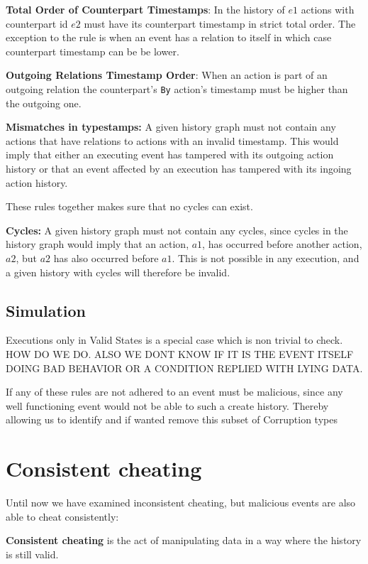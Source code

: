 	\newpar \textbf{Total Order of Counterpart Timestamps}: In the history of $e1$ actions with counterpart id $e2$ must have its counterpart timestamp in strict total order.  The exception to the rule is when an event has a relation to itself in which case counterpart timestamp can be be lower. 
	
	\newpar \textbf{Outgoing Relations Timestamp Order}: When an action is part of an outgoing relation the counterpart's \texttt{By} action's timestamp must be higher than the outgoing one. 
	
	\newpar \textbf{Mismatches in typestamps:} A given history graph must not contain any actions that have relations to actions with an invalid timestamp. This would imply that either an executing event has tampered with its outgoing action history or that an event affected by an execution has tampered with its ingoing action history. 
	
	\newpar These rules together makes sure that no cycles can exist.
	
	\textbf{Cycles:} A given history graph must not contain any cycles, since cycles in the history graph would imply that an action, $a1$, has occurred before another action, $a2$, but $a2$ has also occurred before $a1$. This is not possible in any execution, and a given history with cycles will therefore be invalid.
	
	
	
	
	

	
	\subsection{Simulation}
	Executions only in Valid States is a special case which is non trivial to check. HOW DO WE DO. ALSO WE DONT KNOW IF IT IS THE EVENT ITSELF DOING BAD BEHAVIOR OR A CONDITION REPLIED WITH LYING DATA.
	
	\newpar If any of these rules are not adhered to an event must be malicious, since any well functioning event would not be able to such a create history. Thereby allowing us to identify and if wanted remove this subset of Corruption types 
	
	\section{Consistent cheating}
	Until now we have examined inconsistent cheating, but malicious events are also able to cheat consistently:
	\begin{definition}
		\textbf{Consistent cheating} is the act of manipulating data in a way where the history is still valid.
	\end{definition}
	
